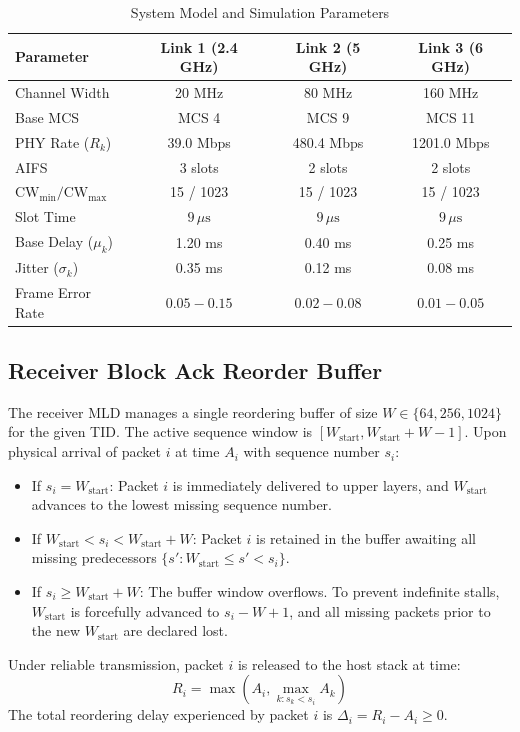 \documentclass[10pt,journal,compsoc]{IEEEtran}
\begin{document}
\begin{table}[t]
\centering
\caption{System Model and Simulation Parameters}
\label{tab:params}
\begin{tabular}{lccc}
\toprule
\textbf{Parameter} & \textbf{Link 1 (2.4 GHz)} & \textbf{Link 2 (5 GHz)} & \textbf{Link 3 (6 GHz)} \\
\midrule
Channel Width & 20 MHz & 80 MHz & 160 MHz \\
Base MCS & MCS 4 & MCS 9 & MCS 11 \\
PHY Rate ($R_k$) & 39.0 Mbps & 480.4 Mbps & 1201.0 Mbps \\
AIFS & 3 slots & 2 slots & 2 slots \\
$\text{CW}_{\min} / \text{CW}_{\max}$ & 15 / 1023 & 15 / 1023 & 15 / 1023 \\
Slot Time & $9\,\mu\text{s}$ & $9\,\mu\text{s}$ & $9\,\mu\text{s}$ \\
Base Delay ($\mu_k$) & 1.20 ms & 0.40 ms & 0.25 ms \\
Jitter ($\sigma_k$) & 0.35 ms & 0.12 ms & 0.08 ms \\
Frame Error Rate & $0.05 - 0.15$ & $0.02 - 0.08$ & $0.01 - 0.05$ \\
\bottomrule
\end{tabular}
\end{table}

\subsection{Receiver Block Ack Reorder Buffer}
The receiver MLD manages a single reordering buffer of size $W \in \{64, 256, 1024\}$ for the given TID. The active sequence window is $[W_{\text{start}}, W_{\text{start}} + W - 1]$. Upon physical arrival of packet $i$ at time $A_i$ with sequence number $s_i$:
\begin{itemize}
    \item If $s_i = W_{\text{start}}$: Packet $i$ is immediately delivered to upper layers, and $W_{\text{start}}$ advances to the lowest missing sequence number.
    \item If $W_{\text{start}} < s_i < W_{\text{start}} + W$: Packet $i$ is retained in the buffer awaiting all missing predecessors $\{s' : W_{\text{start}} \le s' < s_i\}$.
    \item If $s_i \ge W_{\text{start}} + W$: The buffer window overflows. To prevent indefinite stalls, $W_{\text{start}}$ is forcefully advanced to $s_i - W + 1$, and all missing packets prior to the new $W_{\text{start}}$ are declared lost.
\end{itemize}
Under reliable transmission, packet $i$ is released to the host stack at time:
\begin{equation}
    R_i = \max\left(A_i, \max_{k: s_k < s_i} A_k\right)
\end{equation}
The total reordering delay experienced by packet $i$ is $\Delta_i = R_i - A_i \ge 0$.
\end{document}
